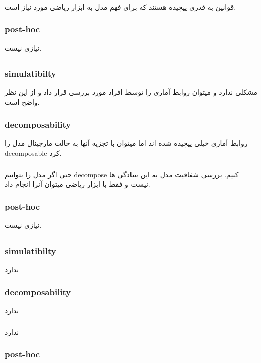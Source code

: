 \documentclass{article}[12pt]
\begin{document}
\subsubsection{}
قوانین به قدری پیچیده هستند که برای فهم مدل به ابزار ریاضی مورد نیاز است. 
\subsubsection{post-hoc}
نیازی نیست. 
\subsection{}
\subsubsection{simulatibilty}
مشکلی ندارد و میتوان روابط آماری را توسط افراد مورد بررسی قرار داد و از این نظر واضح است. 
\subsubsection{decomposability}
روابط آماری خیلی پیچیده شده اند اما میتوان با تجزیه آنها به حالت مارجینال مدل را decomposable کرد. 
\subsubsection{}
حتی اگر مدل را بتوانیم decompose کنیم. بررسی شفافیت مدل به این سادگی ها نیست و فقط با ابزار ریاضی میتوان آنرا انجام داد. 
\subsubsection{post-hoc}
نیازی نیست. 
\subsection{}
\subsubsection{simulatibilty}
ندارد
\subsubsection{decomposability}
ندارد
\subsubsection{}
ندارد
\subsubsection{post-hoc}
\end{document}
